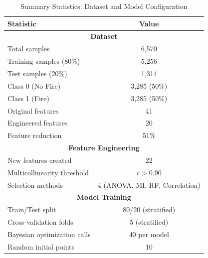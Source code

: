 \begin{table}[H]
\centering
\caption{Summary Statistics: Dataset and Model Configuration}
\label{tab:summary_stats}
\begin{tabular}{|l|c|}
\hline
\textbf{Statistic} & \textbf{Value} \\
\hline
\multicolumn{2}{|c|}{\textbf{Dataset}} \\
\hline
Total samples & 6,570 \\
Training samples (80\%) & 5,256 \\
Test samples (20\%) & 1,314 \\
Class 0 (No Fire) & 3,285 (50\%) \\
Class 1 (Fire) & 3,285 (50\%) \\
Original features & 41 \\
Engineered features & 20 \\
Feature reduction & 51\% \\
\hline
\multicolumn{2}{|c|}{\textbf{Feature Engineering}} \\
\hline
New features created & 22 \\
Multicollinearity threshold & $r > 0.90$ \\
Selection methods & 4 (ANOVA, MI, RF, Correlation) \\
\hline
\multicolumn{2}{|c|}{\textbf{Model Training}} \\
\hline
Train/Test split & 80/20 (stratified) \\
Cross-validation folds & 5 (stratified) \\
Bayesian optimization calls & 40 per model \\
Random initial points & 10 \\
\hline
\end{tabular}
\end{table}
